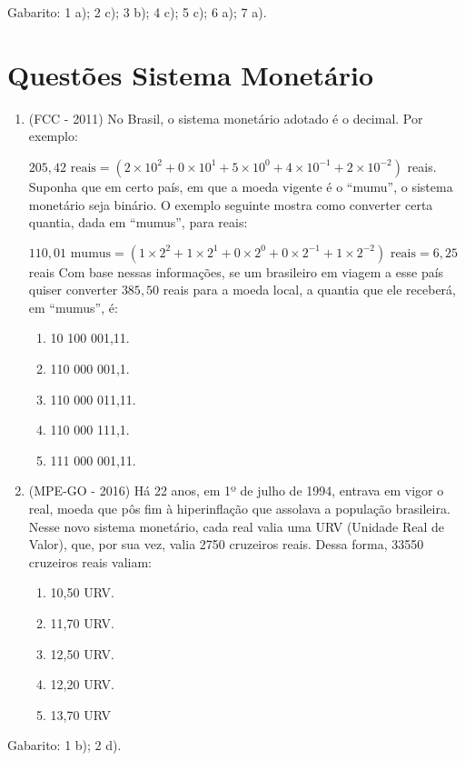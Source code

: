  Gabarito: 1 a); 2 c); 3 b); 4 c); 5 c); 6 a); 7 a).
 
 \section{Questões Sistema Monetário}

\begin{enumerate}[1)]
 \item (FCC - 2011) No Brasil, o sistema monetário adotado é o decimal. Por exemplo:

$205,42 \text{ reais} = (2 \times 10^2 + 0 \times 10^1 + 5 \times 10^0 + 4 \times 10^{-1} + 2 \times 10^{-2})$ reais. Suponha que em certo país, em que a moeda vigente é o “mumu”, o sistema monetário seja binário. O exemplo seguinte mostra como converter certa quantia, dada em “mumus”, para reais:

$110,01 \text{ mumus} = (1 \times 2^2 + 1 \times 2^1 + 0 \times 2^0 + 0 \times 2^{-1} + 1 \times 2^{-2}) \text{ reais} = 6,25$ reais Com base nessas informações, se um brasileiro em viagem a esse país quiser converter $385,50$ reais para a moeda local, a quantia que ele receberá, em “mumus”, é:

\begin{enumerate}
\item 10 100 001,11.
\item 110 000 001,1.
\item 110 000 011,11.
\item 110 000 111,1.
\item 111 000 001,11.
\end{enumerate}

\item (MPE-GO - 2016) Há 22 anos, em 1º de julho de 1994, entrava em vigor o real, moeda que pôs fim à hiperinflação que assolava a população brasileira. Nesse novo sistema monetário, cada real valia uma URV (Unidade Real de Valor), que, por sua vez, valia 2750 cruzeiros reais. Dessa forma, 33550 cruzeiros reais valiam:
\begin{enumerate}
\item 10,50 URV.
\item 11,70 URV.
\item 12,50 URV.
\item 12,20 URV.
\item 13,70 URV
\end{enumerate}

\end{enumerate}

Gabarito: 1 b); 2 d).

